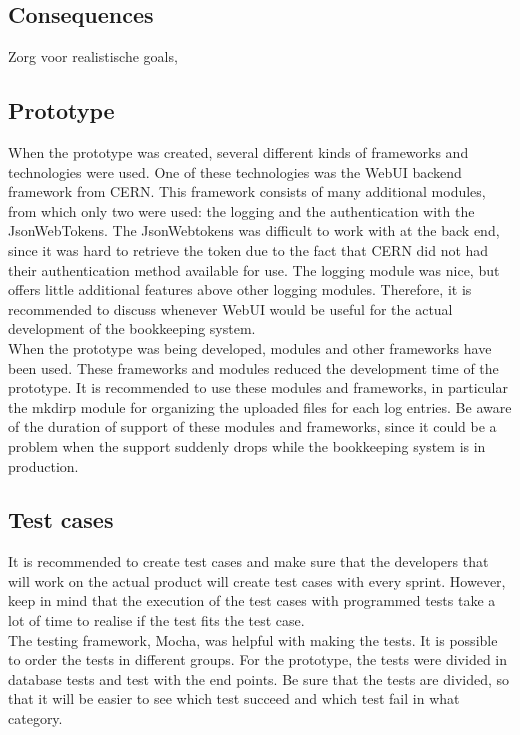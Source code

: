 \documentclass[paper=a4, fontsize=11pt,twoside]{scrartcl}	%
\begin{document}
\subsection{Consequences}
Zorg voor realistische goals, \\

\subsection{Prototype}
When the prototype was created, several different kinds of frameworks and technologies were used. One of these technologies was the WebUI backend framework from CERN. This framework consists of many additional modules, from which only two were used: the logging and the authentication with the JsonWebTokens. The JsonWebtokens was difficult to work with at the back end, since it was hard to retrieve the token due to the fact that CERN did not had their authentication method available for use. The logging module was nice, but offers little additional features above other logging modules. Therefore, it is recommended to discuss whenever WebUI would be useful for the actual development of the bookkeeping system. \\
When the prototype was being developed, modules and other frameworks have been used. These frameworks and modules reduced the development time of the prototype. It is recommended to use these modules and frameworks, in particular the mkdirp module for organizing the uploaded files for each log entries. Be aware of the duration of support of these modules and frameworks, since it could be a problem when the support suddenly drops while the bookkeeping system is in production.


\subsection{Test cases}
It is recommended to create test cases and make sure that the developers that will work on the actual product will create test cases with every sprint. However, keep in mind that the execution of the test cases with programmed tests take a lot of time to realise if the test fits the test case. \\
The testing framework, Mocha, was helpful with making the tests. It is possible to order the tests in different groups. For the prototype, the tests were divided in database tests and test with the end points. Be sure that the tests are divided, so that it will be easier to see which test succeed and which test fail in what category.
\end{document}
